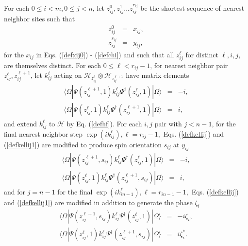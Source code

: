 \documentclass[12pt,amsmath,amssymb,onecolumn]{revtex4-2}
\begin{document}
For each $0 \le i < m, 0 \le j < n$, let
$z^0_{ij}, z^1_{ij} ... z^{r_{ij}}_{ij}$ be the shortest
sequence of nearest neighbor sites
such that 
\begin{subequations}
\begin{eqnarray}
\label{z0}
z^0_{ij} & = & x_{ij}, \\
\label{zlast}
z^{r_{ij}}_{ij} & = & y_{ij},
\end{eqnarray}
\end{subequations}
for the $x_{ij}$ in Eqs. (\ref{defxij0}) - (\ref{defchi})
and such that all $z^\ell_{ij}$ for distinct $\ell, i, j,$ are
themselves distinct.
For each $0 \le \ell < r_{ij} -1$, for nearest neighbor pair $z^\ell_{ij}, z^{\ell+1}_{ij}$,
let $k^\ell_{ij}$ acting on $\mathcal{H}_{z^\ell_{ij}} \otimes \mathcal{H}_{z^{\ell+1}_{ij}}$
have matrix elements
\begin{subequations}
\begin{eqnarray}
\label{defkellij}
 \langle  \Omega| \Psi(z^{\ell+1}_{ij} , 1) k^\ell_{ij}  \Psi^{\dagger}(z^\ell_{ij},1)|\Omega \rangle  &=& -i, \\
\label{defkellij1}
 \langle  \Omega| \Psi(z^\ell_{ij},1)  k^\ell_{ij} \Psi^{\dagger}( z^{\ell+1}_{ij},1)|\Omega \rangle  &=& i,
\end{eqnarray}
\end{subequations}
and extend $ k^\ell_{ij}$ to $\mathcal{H}$ by Eq. (\ref{defhf}).
For each $i,j$ pair with $j<n-1$, for  the final nearest neighbor step
$\exp( i k^\ell_{ij}), \ell = r_{ij} - 1,$
Eqs. (\ref{defkellij}) and (\ref{defkellij1})
are modified
to produce spin orientation $s_{ij}$ at $y_{ij}$
\begin{subequations}
\begin{eqnarray}
\label{defkellij2}
 \langle  \Omega| \Psi(z^{\ell+1}_{ij} , s_{ij}) k^\ell_{ij}  \Psi^{\dagger}(z^\ell_{ij},1)|\Omega \rangle  &=& -i, \\
\label{defkellij12}
 \langle  \Omega| \Psi(z^\ell_{ij},1)  k^\ell_{ij} \Psi^{\dagger}( z^{\ell+1}_{ij},s_{ij})|\Omega \rangle  &=& i,
\end{eqnarray}
\end{subequations}
and for $j = n-1$ for
the final $\exp( i k^\ell_{in-1}), \ell = r_{in-1} - 1,$
Eqs. (\ref{defkellij}) and (\ref{defkellij1})
are modified
in addition to generate the phase $\zeta_i$
\begin{subequations}
\begin{eqnarray}
\label{defkellij3}
 \langle  \Omega| \Psi(z^{\ell+1}_{ij} , s_{ij}) k^\ell_{ij}  \Psi^{\dagger}(z^\ell_{ij},1)|\Omega \rangle  &=& -i \zeta_i, \\
\label{defkellij13}
 \langle  \Omega| \Psi(z^\ell_{ij},1)  k^\ell_{ij} \Psi^{\dagger}( z^{\ell+1}_{ij},s_{ij})|\Omega \rangle  &=& i \zeta^*_i.
\end{eqnarray}
\end{subequations}
\end{document}
